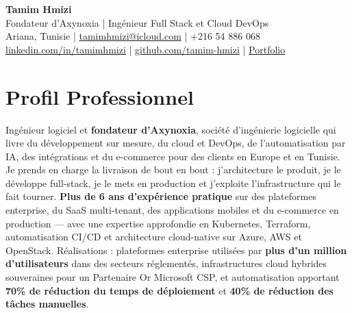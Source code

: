 \documentclass[10pt, letterpaper]{article}
\begin{document}
{\fontsize{24}{24}\selectfont \textbf{\color{accent}Tamim Hmizi}} \\[4pt]
{\large Fondateur d'Axynoxia \;|\; Ingénieur Full Stack et Cloud DevOps} \\[6pt]
Ariana, Tunisie \;|\;
\href{mailto:tamimhmizi@icloud.com}{tamimhmizi@icloud.com} \;|\;
+216 54 886 068 \\
\href{https://linkedin.com/in/tamimhmizi}{linkedin.com/in/tamimhmizi} \;|\;
\href{https://github.com/tamim-hmizi}{github.com/tamim-hmizi} \;|\;
\href{https://tamim-hmizi.github.io/Portfolio/}{Portfolio}

\vspace{0.4cm}

\section{Profil Professionnel}
Ingénieur logiciel et \textbf{fondateur d'Axynoxia}, société d'ingénierie logicielle qui livre du développement sur mesure, du cloud et DevOps, de l'automatisation par IA, des intégrations et du e-commerce pour des clients en Europe et en Tunisie.
Je prends en charge la livraison de bout en bout : j'architecture le produit, je le développe full-stack, je le mets en production et j'exploite l'infrastructure qui le fait tourner.
\textbf{Plus de 6 ans d'expérience pratique} sur des plateformes enterprise, du SaaS multi-tenant, des applications mobiles et du e-commerce en production --- avec une expertise approfondie en Kubernetes, Terraform, automatisation CI/CD et architecture cloud-native sur Azure, AWS et OpenStack.
Réalisations : plateformes enterprise utilisées par \textbf{plus d'un million d'utilisateurs} dans des secteurs réglementés, infrastructures cloud hybrides souveraines pour un Partenaire Or Microsoft CSP, et automatisation apportant \textbf{70\% de réduction du temps de déploiement} et \textbf{40\% de réduction des tâches manuelles}.

\end{document}
